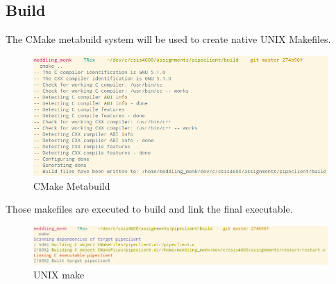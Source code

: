 \documentclass[letter,12pt,sffamily]{article}
\begin{document}
\subsection{Build}
The CMake metabuild system will be used to create native UNIX Makefiles. 
\begin{figure}[H]
	\centering
	\includegraphics[width=1\linewidth]{./images/13}
	\caption[CMake_prep]{CMake Metabuild}
	\label{fig:14}
\end{figure}
Those makefiles are executed to build and link the final executable.
\begin{figure}[H]
	\centering
	\includegraphics[width=1\linewidth]{./images/14}
	\caption[make_build]{UNIX make}
	\label{fig:15}
\end{figure}
\end{document}
